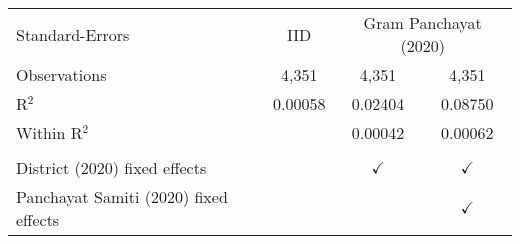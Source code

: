 \begin{tabular}{lccc}
    \\
   Standard-Errors & IID & \multicolumn{2}{c}{Gram Panchayat (2020)} \\ 
   Observations                                            & 4,351    & 4,351         & 4,351\\  
   R$^2$                                                   & 0.00058  & 0.02404       & 0.08750\\  
   Within R$^2$                                            &          & 0.00042       & 0.00062\\  
    \\
   District (2020) fixed effects                           &          & $\checkmark$  & $\checkmark$\\   
   Panchayat Samiti (2020) fixed effects                   &          &               & $\checkmark$\\   
   \bottomrule
\end{tabular}
\par\endgroup


